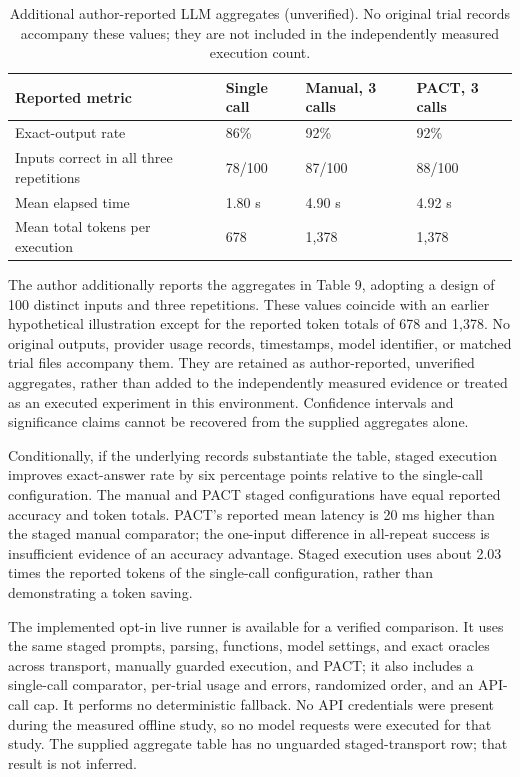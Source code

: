 \documentclass[10pt,twocolumn,a4paper]{article}
\begin{document}
\begin{table}[t]
\centering
\caption{Additional author-reported LLM aggregates (unverified). No original trial records accompany these values; they are not included in the independently measured execution count.}
\label{tab:llm-reported}
\small
\setlength{\tabcolsep}{4pt}
\renewcommand{\arraystretch}{1.12}
\begin{tabularx}{\textwidth}{@{}Xlll@{}}
\toprule
Reported metric & Single call & Manual, 3 calls & PACT, 3 calls\\
\midrule
Exact-output rate & 86\% & 92\% & 92\%\\
Inputs correct in all three repetitions & 78/100 & 87/100 & 88/100\\
Mean elapsed time & 1.80 s & 4.90 s & 4.92 s\\
Mean total tokens per execution & 678 & 1,378 & 1,378\\
\bottomrule
\end{tabularx}
\end{table}
The author additionally reports the aggregates in Table 9, adopting a design of 100 distinct inputs and three repetitions. These values coincide with an earlier hypothetical illustration except for the reported token totals of 678 and 1,378. No original outputs, provider usage records, timestamps, model identifier, or matched trial files accompany them. They are retained as author-reported, unverified aggregates, rather than added to the independently measured evidence or treated as an executed experiment in this environment. Confidence intervals and significance claims cannot be recovered from the supplied aggregates alone.


Conditionally, if the underlying records substantiate the table, staged execution improves exact-answer rate by six percentage points relative to the single-call configuration. The manual and PACT staged configurations have equal reported accuracy and token totals. PACT's reported mean latency is 20 ms higher than the staged manual comparator; the one-input difference in all-repeat success is insufficient evidence of an accuracy advantage. Staged execution uses about 2.03 times the reported tokens of the single-call configuration, rather than demonstrating a token saving.


The implemented opt-in live runner is available for a verified comparison. It uses the same staged prompts, parsing, functions, model settings, and exact oracles across transport, manually guarded execution, and PACT; it also includes a single-call comparator, per-trial usage and errors, randomized order, and an API-call cap. It performs no deterministic fallback. No API credentials were present during the measured offline study, so no model requests were executed for that study. The supplied aggregate table has no unguarded staged-transport row; that result is not inferred.
\end{document}
